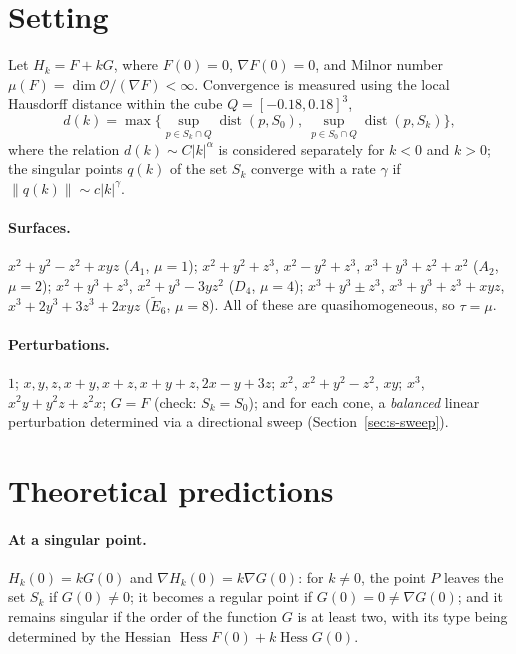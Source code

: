 \documentclass[11pt, a4paper]{article}
\theoremstyle{plain}
\theoremstyle{definition}
\theoremstyle{remark}
\theoremstyle{definition}
\begin{document}
\section{Setting}
Let $H_k=F+kG$, where $F(0)=0$, $\nabla F(0)=0$, and Milnor number
$\mu(F)=\dim\mathcal O/(\nabla F)<\infty$. Convergence is measured using the local
Hausdorff distance within the cube $Q=[-0.18,0.18]^3$,
\[
d(k)=\max\Big\{\sup_{p\in S_k\cap Q}\operatorname{dist}(p,S_0),\ \sup_{p\in S_0\cap Q}\operatorname{dist}(p,S_k)\Big\},
\]
where the relation $d(k)\sim C|k|^\alpha$ is considered separately for $k<0$ and $k>0$; the singular points
$q(k)$ of the set $S_k$ converge with a rate $\gamma$ if $\|q(k)\|\sim c|k|^\gamma$.

\paragraph{Surfaces.} $x^2+y^2-z^2+xyz$ ($A_1$, $\mu=1$); $x^2+y^2+z^3$,
$x^2-y^2+z^3$, $x^3+y^3+z^2+x^2$ ($A_2$, $\mu=2$); $x^2+y^3+z^3$, $x^2+y^3-3yz^2$
($D_4$, $\mu=4$); $x^3+y^3\pm z^3$, $x^3+y^3+z^3+xyz$, $x^3+2y^3+3z^3+2xyz$
($\tilde E_6$, $\mu=8$). All of these are quasihomogeneous, so $\tau=\mu$. 
\paragraph{Perturbations.} $1$; $x,y,z,x+y,x+z,x+y+z,2x-y+3z$; $x^2$, $x^2+y^2-z^2$,
$xy$; $x^3$, $x^2y+y^2z+z^2x$; $G=F$ (check: $S_k=S_0$); and for each cone,
a \emph{balanced} linear perturbation determined via a directional sweep (Section~\ref{sec:s-sweep}).
\section{Theoretical predictions}
\paragraph{At a singular point.} $H_k(0)=kG(0)$ and $\nabla H_k(0)=k\nabla G(0)$:
for $k\neq0$, the point $P$ leaves the set $S_k$ if $G(0)\neq0$; it becomes a regular point if
$G(0)=0\neq\nabla G(0)$; and it remains singular if the order of the function $G$ is at least two,
with its type being determined by the Hessian $\operatorname{Hess}F(0)+k\operatorname{Hess}G(0)$.
\end{document}
